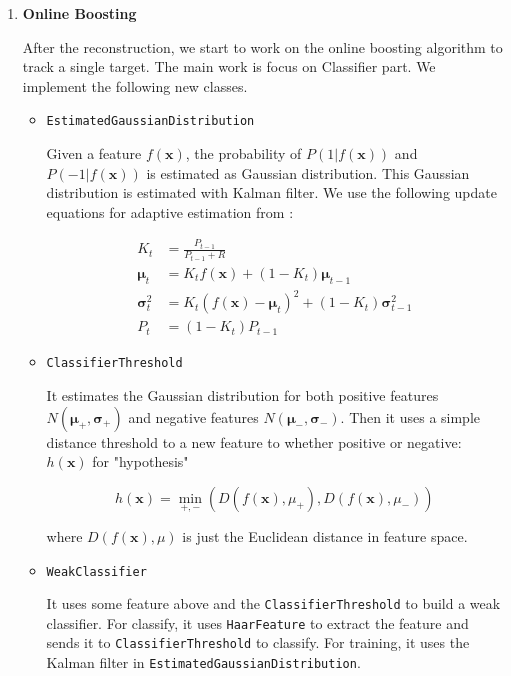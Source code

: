 \documentclass[a4paper]{article}
\begin{document}
\begin{enumerate}
\item \textbf{Online Boosting}

After the reconstruction, we start to work on the online boosting algorithm to track a single target. The main work is focus on Classifier part. We implement the following new classes.

\begin{itemize}

\item \lstinline{EstimatedGaussianDistribution}

Given a feature $f(\mathbf{x})$, the probability of $P(1|f(\mathbf{x}))$ and $P(-1|f(\mathbf{x}))$ is estimated as Gaussian distribution\cite{Grabner:2006:OBV:1153170.1153451}. This Gaussian distribution is estimated with Kalman filter\cite{Welch:1995:IKF:897831}. We use the following update equations for adaptive estimation from \cite{Grabner:2006:OBV:1153170.1153451}:

\begin{subequations}
\begin{align}
K_{t}&=\frac{P_{t-1}}{P_{t-1}+R}\\
\mathbf{\mu}_{t}&=K_{t}f(\mathbf{x})+(1-K_{t})\mathbf{\mu}_{t-1}\\
\mathbf{\sigma}_{t}^{2}&=K_{t}(f(\mathbf{x})-\mathbf{\mu}_{t})^{2}+(1-K_{t})\mathbf{\sigma}_{t-1}^{2}\\
P_{t}&=(1-K_{t})P_{t-1}
\end{align}
\end{subequations}

\item \lstinline{ClassifierThreshold}

It estimates the Gaussian distribution for both positive features $N(\mathbf{\mu_{+}}, \mathbf{\sigma_{+}})$ and negative features $N(\mathbf{\mu_{-}}, \mathbf{\sigma_{-}})$. Then it uses a simple distance threshold to a new feature to whether positive or negative: $h(\mathbf{x})$ for "hypothesis"

\begin{equation}
h(\mathbf{x})=\min_{+, -}(D(f(\mathbf{x}), \mu_{+}), D(f(\mathbf{x}), \mu_{-}))
\end{equation}

where $D(f(\mathbf{x}), \mu)$ is just the Euclidean distance in feature space.

\item \lstinline{WeakClassifier}

It uses some feature above and the \lstinline{ClassifierThreshold} to build a weak classifier. For classify, it uses \lstinline{HaarFeature} to extract the feature and sends it to \lstinline{ClassifierThreshold} to classify. For training, it uses the Kalman filter in \lstinline{EstimatedGaussianDistribution}.


\end{itemize}
\end{enumerate}
\end{document}
